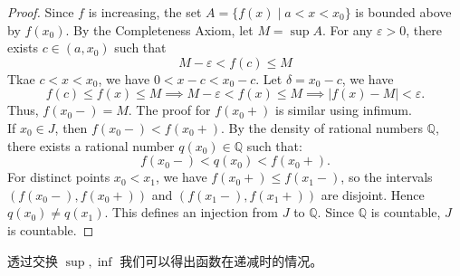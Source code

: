 \documentclass[
	UTF-8,
	11pt, %
	a4paper, %
]{LegrandOrangeBook}
\begin{document}
    \begin{proof}
    Since $f$ is increasing, the set $A = \{ f(x) \mid a < x < x_0 \}$ is bounded above by $f(x_0)$. By the Completeness Axiom, let $M = \sup A$.
    For any $\varepsilon > 0$, there exists $c \in (a, x_0)$ such that 
    $$M - \varepsilon < f(c) \le M$$
    Tkae $ c < x < x_0$, we have $0 < x-c <x_0 - c$. Let $\delta = x_0 - c$, we have
    \[ f(c) \le f(x) \le M \implies M - \varepsilon < f(x) \le M \implies |f(x) - M| < \varepsilon. \]
    Thus, $f(x_0-) = M$. The proof for $f(x_0+)$ is similar using infimum.\\
    
    If $x_0 \in J$, then $f(x_0-) < f(x_0+)$. By the density of rational numbers $\mathbb{Q}$, there exists a rational number $q(x_0) \in \mathbb{Q}$ such that:
    \[ f(x_0-) < q(x_0) < f(x_0+). \]
    For distinct points $x_0 < x_1$, we have $f(x_0+) \le f(x_1-)$, so the intervals $(f(x_0-), f(x_0+))$ and $(f(x_1-), f(x_1+))$ are disjoint. Hence $q(x_0) \neq q(x_1)$.
    This defines an injection from $J$ to $\mathbb{Q}$. Since $\mathbb{Q}$ is countable, $J$ is countable.
    \end{proof}

    \begin{remark}
        透过交换 $\sup, \inf$ 我们可以得出函数在递减时的情况。
    \end{remark}
\end{document}

